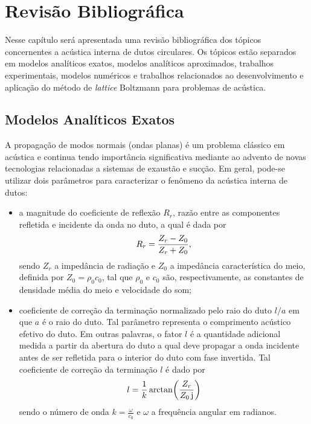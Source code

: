 \chapter{Revisão Bibliográfica}

Nesse capítulo será apresentada uma revisão bibliográfica dos tópicos concernentes a acústica interna de dutos circulares. Os tópicos estão separados em modelos analíticos exatos, modelos analíticos aproximados, trabalhos experimentais, modelos numéricos e trabalhos relacionados ao desenvolvimento e aplicação do método de \textit{lattice} Boltzmann para problemas de acústica.

\section{Modelos Analíticos Exatos} 

A propagação de modos normais (ondas planas) é um problema clássico em acústica e continua tendo importância significativa mediante ao advento de novas tecnologias relacionadas a sistemas de exaustão e sucção. Em geral, pode-se utilizar dois parâmetros para caracterizar o fenômeno da acústica interna de dutos:

\begin{itemize}
    \item a magnitude do coeficiente de reflexão $R_{r}$, razão entre as componentes refletida e incidente da onda no duto, a qual é dada por
    \begin{equation}
        R_{r}\simbolo{$R_{r}$}{Coeficiente de reflexão na terminação do duto} =\frac{Z_{r} - Z_{0}}{Z_{r} + Z_{0}},
        \label{eq:R}
    \end{equation}
    sendo $Z_{r}$ a impedância de radiação e $Z_{0}$ a impedância característica do meio, definida por $Z_{0} = \rho_{0}c_{0}$, tal que $\rho_{0}$ e $c_{0}$ são, respectivamente, as constantes de densidade média do meio e velocidade do som;
    
    \item coeficiente de correção da terminação normalizado pelo raio do duto $l/a$ em que $a$ é o raio do duto. Tal parâmetro representa o comprimento acústico efetivo do duto. Em outras palavras, o fator $l$ é a quantidade adicional medida a partir da abertura do duto a qual deve propagar a onda incidente antes de ser refletida para o interior do duto com fase invertida. Tal coeficiente de correção da terminação $l$ é dado por
    \begin{equation}
        l = \frac{1}{k} \arctan\!\left(\frac{Z_{r}}{Z_{0} \, \mathrm{j}\simbolo{$j$}{Unidade imaginária}}\right)
        \label{eq:l}
    \end{equation}
    sendo o número de onda $k = \frac{\omega}{c_0}$ e $\omega$ a frequência angular em radianos.
\end{itemize}

